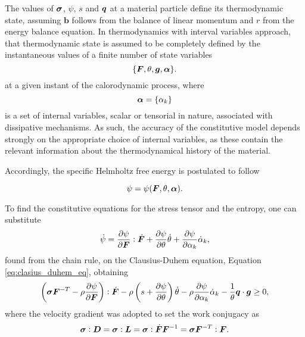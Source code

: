The values of $\bm{\sigma}$, $\psi$, $s$ and $\bm{q}$ at a material particle define its thermodynamic state, assuming \(\bm b\) follows from the balance of linear momentum and \(r\) from the energy balance equation.
In thermodynamics with interval variables approach, that thermodynamic state is assumed to be completely defined by the instantaneous values of a finite number of state variables
\begin{equation}
    \{\bm{F}, \theta, \bm{g}, \bm{\alpha}\}.
\end{equation}
at a given instant of the calorodynamic process, where
\begin{equation}
    \bm{\alpha} = \{\alpha_k\}
\end{equation}
is a set of internal variables, scalar or tensorial in nature, associated with dissipative mechanisms.
As such, the accuracy of the constitutive model depends strongly on the appropriate choice of internal variables, as these contain the relevant information about the thermodynamical history of the material.

Accordingly, the specific Helmholtz free energy is postulated to follow
\begin{highlight}
    \begin{equation}
        \psi = \psi(\bm{F}, \theta, \bm{\alpha}).
    \end{equation}
\end{highlight}
To find the constitutive equations for the stress tensor and the entropy, one can substitute
\begin{equation}
    \dot \psi = \frac{\partial \psi}{\partial \bm{F}}:\dot{\bm{F}} + \frac{\partial \psi}{\partial \theta}\dot \theta + \frac{\partial \psi}{\partial \alpha_k}\dot \alpha_k,
\end{equation}
found from the chain rule, on the Clausius-Duhem equation, Equation \eqref{eq:clasius_duhem_eq}, obtaining
\begin{equation}
    \left(\bm{\sigma} \bm{F}^{-T} -\rho\frac{\partial \psi}{\partial \bm{F}}\right):\dot{\bm{F}} -\rho \left(s+\frac{\partial \psi}{\partial \theta}\right)\dot \theta - \rho \frac{\partial \psi}{\partial \alpha_k}\dot\alpha_k - \frac{1}{\theta}\bm{q} \cdot \bm{g}\geq 0,\label{eq:clausius_duhem_energy}
\end{equation}
where the velocity gradient was adopted to set the work conjugacy as
\begin{equation}
    \bm{\sigma} :\bm{D} = \bm{\sigma} :\bm{L} = \bm{\sigma} :\dot{\bm{F}}\bm{F}^{-1} = \bm{\sigma} \bm{F}^{-T}:\bm{F}.
\end{equation}


